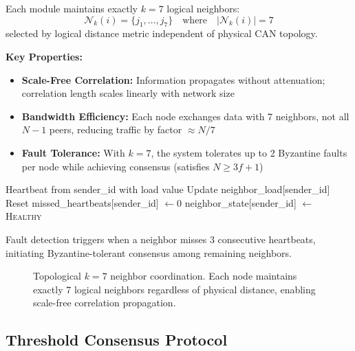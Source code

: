 \begin{definition}
Each module maintains exactly $k=7$ logical neighbors:
\begin{equation}
\mathcal{N}_k(i) = \{j_1, \ldots, j_7\} \quad \text{where} \quad |\mathcal{N}_k(i)| = 7
\end{equation}
selected by logical distance metric independent of physical CAN topology.
\end{definition}

\textbf{Key Properties:}
\begin{itemize}
    \item \textbf{Scale-Free Correlation:} Information propagates without attenuation; correlation length scales linearly with network size
    \item \textbf{Bandwidth Efficiency:} Each node exchanges data with 7 neighbors, not all $N-1$ peers, reducing traffic by factor $\approx N/7$
    \item \textbf{Fault Tolerance:} With $k=7$, the system tolerates up to 2 Byzantine faults per node while achieving consensus (satisfies $N \geq 3f + 1$)
\end{itemize}

\begin{algorithm}
\caption{Neighbor State Update}
\label{alg:neighbor}
\begin{algorithmic}[1]
\REQUIRE Heartbeat from sender\_id with load value
    \STATE Update neighbor\_load[sender\_id]
    \STATE Reset missed\_heartbeats[sender\_id] $\leftarrow 0$
    \STATE neighbor\_state[sender\_id] $\leftarrow$ \textsc{Healthy}
\ENDIF
\end{algorithmic}
\end{algorithm}

Fault detection triggers when a neighbor misses 3 consecutive heartbeats, initiating Byzantine-tolerant consensus among remaining neighbors.

\begin{figure}[htbp]
\centering

\caption{Topological $k=7$ neighbor coordination. Each node maintains exactly 7 logical neighbors regardless of physical distance, enabling scale-free correlation propagation.}
\label{fig:k7}
\end{figure}

\subsection{Threshold Consensus Protocol}

